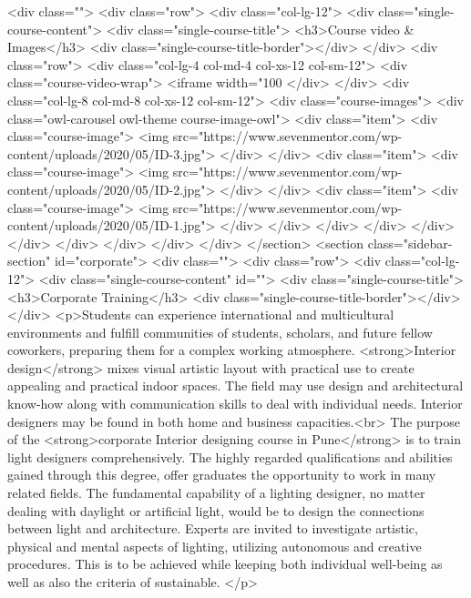 {<div class="">
<div class="row">
<div class="col-lg-12">
<div class="single-course-content">
<div class="single-course-title">
<h3>Course video & Images</h3>
<div class="single-course-title-border"></div>
</div>
<div class="row">
<div class="col-lg-4 col-md-4 col-xs-12 col-sm-12">
<div class="course-video-wrap">
<iframe width="100%
</div>
</div>
<div class="col-lg-8 col-md-8 col-xs-12 col-sm-12">
<div class="course-images">
<div class="owl-carousel owl-theme course-image-owl">
<div class="item">
<div class="course-image">
<img src="https://www.sevenmentor.com/wp-content/uploads/2020/05/ID-3.jpg">
</div>
</div>
<div class="item">
<div class="course-image">
<img src="https://www.sevenmentor.com/wp-content/uploads/2020/05/ID-2.jpg">
</div>
</div>
<div class="item">
<div class="course-image">
<img src="https://www.sevenmentor.com/wp-content/uploads/2020/05/ID-1.jpg">
</div>
</div>
</div>
</div>
</div>
</div>
</div>
</div>
</div>
</div>
</section>
<section class="sidebar-section" id="corporate">
<div class="">
<div class="row">
<div class="col-lg-12">
<div class="single-course-content" id="">
<div class="single-course-title">
<h3>Corporate Training</h3>
<div class="single-course-title-border"></div>
</div>
<p>Students can experience international and multicultural environments and fulfill communities of students, scholars, and future fellow coworkers, preparing them for a complex working atmosphere. <strong>Interior design</strong> mixes visual artistic layout with practical use to create appealing and practical indoor spaces. The field may use design and architectural know-how along with communication skills to deal with individual needs. Interior designers may be found in both home and business capacities.<br>
The purpose of the <strong>corporate Interior designing course in Pune</strong> is to train light designers comprehensively. The highly regarded qualifications and abilities gained through this degree, offer graduates the opportunity to work in many related fields. The fundamental capability of a lighting designer, no matter dealing with daylight or artificial light, would be to design the connections between light and architecture. Experts are invited to investigate artistic, physical and mental aspects of lighting, utilizing autonomous and creative procedures. This is to be achieved while keeping both individual well-being as well as also the criteria of sustainable.
</p>
}
